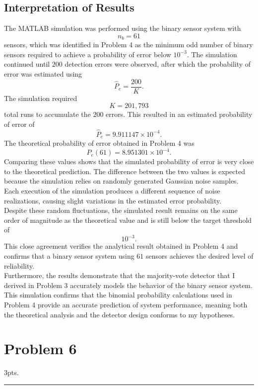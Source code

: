 \documentclass[12pt,a4paper]{article}
\begin{document}
\subsection{Interpretation of Results}

The MATLAB simulation was performed using the binary sensor system with
\[
n_b=61
\]
sensors, which was identified in Problem 4 as the minimum odd number of binary sensors required to achieve a probability of error below \(10^{-3}\). The simulation continued until \(200\) detection errors were observed, after which the probability of error was estimated using
\[
\hat{P}_e=\frac{200}{K}.
\]
The simulation required
\[
K=201{,}793
\]
total runs to accumulate the \(200\) errors. This resulted in an estimated probability of error of
\[
\hat{P}_e
=
9.911147\times10^{-4}.
\]
The theoretical probability of error obtained in Problem 4 was
\[
P_e(61)
=
8.951301\times10^{-4}.
\]
Comparing these values shows that the simulated probability of error is very close to the theoretical prediction. The difference between the two values is expected because the simulation relies on randomly generated Gaussian noise samples. Each execution of the simulation produces a different sequence of noise realizations, causing slight variations in the estimated error probability.\\

Despite these random fluctuations, the simulated result remains on the same order of magnitude as the theoretical value and is still below the target threshold of
\[
10^{-3}.
\]
This close agreement verifies the analytical result obtained in Problem 4 and confirms that a binary sensor system using \(61\) sensors achieves the desired level of reliability.\\

Furthermore, the results demonstrate that the majority-vote detector that I derived in Problem 3 accurately models the behavior of the binary sensor system. This simulation confirms that the binomial probability calculations used in Problem 4 provide an accurate prediction of system performance, meaning both the theoretical analysis and the detector design conforms to my hypotheses.
\clearpage

\section{Problem 6}
3pts.\\

\hrule 

\
\end{document}
